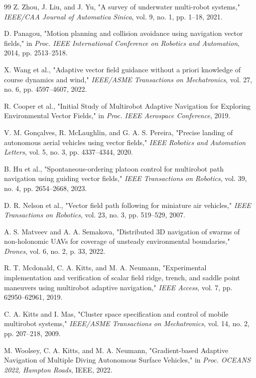 \documentclass[lettersize,journal]{IEEEtran}
\begin{document}
\begin{thebibliography}{99}
 Z. Zhou, J. Liu, and J. Yu, "A survey of underwater multi-robot systems," \textit{IEEE/CAA Journal of Automatica Sinica}, vol. 9, no. 1, pp. 1--18, 2021.

 D. Panagou, "Motion planning and collision avoidance using navigation vector fields," in \textit{Proc. IEEE International Conference on Robotics and Automation}, 2014, pp. 2513--2518.

 X. Wang et al., "Adaptive vector field guidance without a priori knowledge of course dynamics and wind," \textit{IEEE/ASME Transactions on Mechatronics}, vol. 27, no. 6, pp. 4597--4607, 2022.

 R. Cooper et al., "Initial Study of Multirobot Adaptive Navigation for Exploring Environmental Vector Fields," in \textit{Proc. IEEE Aerospace Conference}, 2019.

 V. M. Gonçalves, R. McLaughlin, and G. A. S. Pereira, "Precise landing of autonomous aerial vehicles using vector fields," \textit{IEEE Robotics and Automation Letters}, vol. 5, no. 3, pp. 4337--4344, 2020.

 B. Hu et al., "Spontaneous-ordering platoon control for multirobot path navigation using guiding vector fields," \textit{IEEE Transactions on Robotics}, vol. 39, no. 4, pp. 2654--2668, 2023.

 D. R. Nelson et al., "Vector field path following for miniature air vehicles," \textit{IEEE Transactions on Robotics}, vol. 23, no. 3, pp. 519--529, 2007.

 A. S. Matveev and A. A. Semakova, "Distributed 3D navigation of swarms of non-holonomic UAVs for coverage of unsteady environmental boundaries," \textit{Drones}, vol. 6, no. 2, p. 33, 2022.

 R. T. Mcdonald, C. A. Kitts, and M. A. Neumann, "Experimental implementation and verification of scalar field ridge, trench, and saddle point maneuvers using multirobot adaptive navigation," \textit{IEEE Access}, vol. 7, pp. 62950--62961, 2019.

 C. A. Kitts and I. Mas, "Cluster space specification and control of mobile multirobot systems," \textit{IEEE/ASME Transactions on Mechatronics}, vol. 14, no. 2, pp. 207--218, 2009.

 M. Woolsey, C. A. Kitts, and M. A. Neumann, "Gradient-based Adaptive Navigation of Multiple Diving Autonomous Surface Vehicles," in \textit{Proc. OCEANS 2022, Hampton Roads}, IEEE, 2022.

\end{thebibliography}
\end{document}
